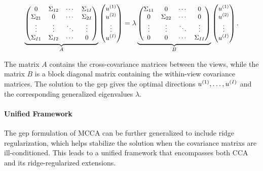 \begin{align}
    \small
    \underbrace{\begin{pmatrix}
        0           & \Sigma_{12} & \cdots & \Sigma_{1I} \\
        \Sigma_{21} & 0           & \cdots & \Sigma_{2I} \\
        \vdots      & \vdots      & \ddots & \vdots      \\
        \Sigma_{I1} & \Sigma_{I2} & \cdots & 0
    \end{pmatrix}}_{A}
    \begin{pmatrix}
        u^{(1)} \\
        u^{(2)} \\
        \vdots   \\
        u^{(I)}
    \end{pmatrix}
    =
    \lambda
    \underbrace{\begin{pmatrix}
        \Sigma_{11} & 0           & \cdots & 0           \\
        0           & \Sigma_{22} & \cdots & 0           \\
        \vdots      & \vdots      & \ddots & \vdots      \\
        0           & 0           & \cdots & \Sigma_{II}
    \end{pmatrix}}_{B}
    \begin{pmatrix}
        u^{(1)} \\
        u^{(2)} \\
        \vdots   \\
        u^{(I)}
    \end{pmatrix}.
\end{align}

The matrix $A$ contains the cross-covariance matrices between the views, while the matrix $B$ is a block diagonal matrix containing the within-view covariance matrices. The solution to the \acrshort{gep} gives the optimal directions $u^{(1)}, \dots, u^{(I)}$ and the corresponding generalized eigenvalues $\lambda$.

\paragraph{Unified Framework}

The \acrshort{gep} formulation of MCCA can be further generalized to include ridge regularization, which helps stabilize the solution when the  \glspl{covariance matrix} are ill-conditioned. This leads to a unified framework that encompasses both CCA and its ridge-regularized extensions.

